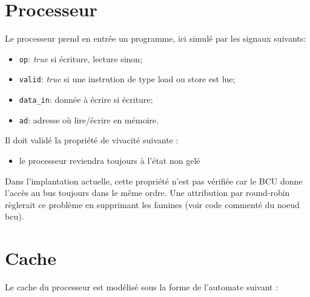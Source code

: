\documentclass[a4paper, 11pt]{article}
\begin{document}
\section{Processeur}
Le processeur prend en entrée un programme, ici simulé par les signaux suivants:
\begin{itemize}
  \item \texttt{op}: \textit{true} si écriture, lecture sinon;
  \item \texttt{valid}: \textit{true} si une instrution de type load ou store 
    est lue;
  \item \texttt{data\_in}: donnée à écrire si écriture;
  \item \texttt{ad}: adresse où lire/écrire en mémoire.
\end{itemize}
Il doit validé la propriété de vivacité suivante :
\begin{itemize}
  \item le processeur reviendra toujours à l'état non gelé
\end{itemize}
Dans l'implantation actuelle, cette propriété n'est pas vérifiée car le BCU
donne l'accès au bus toujours dans le même ordre. Une attribution par 
round-robin règlerait ce problème en supprimant les famines (voir code 
commenté du noeud bcu).

\section{Cache}
Le cache du processeur est modélisé sous la forme de l'automate suivant :
\begin{center}
\end{center}
\end{document}
